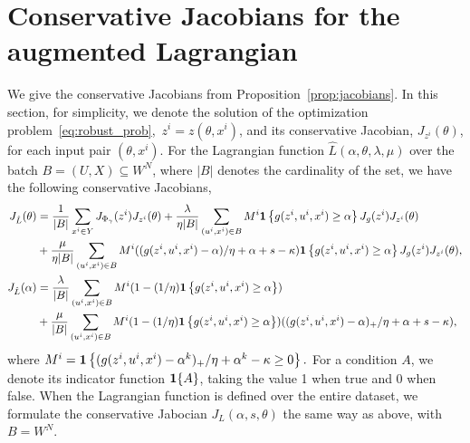 
\section{Conservative Jacobians for the augmented Lagrangian}
\label{appx:jacobians}
We give the conservative Jacobians from Proposition~\ref{prop:jacobians}. 
In this section, for simplicity,  we denote the solution of the optimization problem~\eqref{eq:robust_prob},~$z^i = z(\theta,x^i)$, and its conservative Jacobian, $ J_{z^i}(\theta)$, for each input pair $(\theta, x^i)$. 
For the Lagrangian function $\hat{L}(\alpha,\theta,\lambda, \mu)$ over the batch $B = (U,X) \subseteq W^N$, where $|B|$ denotes the cardinality of the set, we have the following conservative Jacobians,
\begin{equation*}
\begin{aligned}
J_{\hat{L}}(\theta) &= \frac{1}{|B|}\sum_{x^i \in Y} J_{\Phi_{\gamma}}(z^i)J_{z^i}(\theta) + \frac{\lambda}{\eta |B|}\sum_{(u^i,x^i)\in B}   M^i\mathbf 1\left\{g(z^i,u^i,x^i) \geq \alpha\right\} J_{g}(z^i)J_{z^i}(\theta) \\
&+ \frac{\mu}{\eta|B|}\sum_{(u^i,x^i)\in B} M^i((g(z^i,u^i,x^i)- \alpha)/\eta + \alpha+s-\kappa)\mathbf 1\left\{g(z^i,u^i,x^i) \geq \alpha\right\}J_{g}(z^i)J_{z^i}(\theta) ,\\
J_{\hat{L}}(\alpha) &= \frac{ \lambda}{|B|}\sum_{(u^i,x^i)\in B} M^i(1 - (1/\eta)\mathbf 1\left\{g(z^i,u^i,x^i) \geq \alpha\right\})\\
&+ \frac{\mu}{|B|}\sum_{(u^i,x^i)\in B}  M^i (1 - (1/\eta)\mathbf 1\left\{g(z^i,u^i,x^i) \geq \alpha\right\} ) ((g(z^i,u^i,x^i)- \alpha)_+/\eta + \alpha +s-\kappa),
\end{aligned}
\end{equation*}
where $M^i = \mathbf 1\left\{(g(z^i,u^i,x^i) - \alpha^k)_+/\eta + \alpha^k - \kappa \geq 0\right\}.$ For a condition $A$, we denote its indicator function $\mathbf 1\{A\}$, taking the value 1 when true and 0 when false. 
When the Lagrangian function is defined over the entire dataset, we formulate the conservative Jabocian $J_L(\alpha,s,\theta)$ the same way as above, with $B = W^N$.


